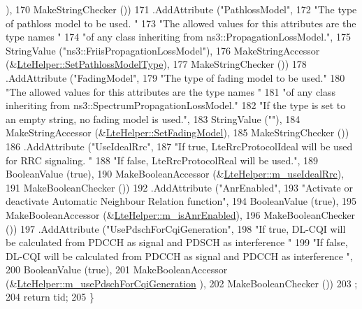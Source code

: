 \begin{DoxyCode}
      ),
170                    MakeStringChecker ())
171     .AddAttribute (\textcolor{stringliteral}{"PathlossModel"},
172                    \textcolor{stringliteral}{"The type of pathloss model to be used. "}
173                    \textcolor{stringliteral}{"The allowed values for this attributes are the type names "}
174                    \textcolor{stringliteral}{"of any class inheriting from ns3::PropagationLossModel."},
175                    StringValue (\textcolor{stringliteral}{"ns3::FriisPropagationLossModel"}),
176                    MakeStringAccessor (&\hyperlink{classns3_1_1LteHelper_afc1acbe82dd719d319e7d79b50e99ba7}{LteHelper::SetPathlossModelType}),
177                    MakeStringChecker ())
178     .AddAttribute (\textcolor{stringliteral}{"FadingModel"},
179                    \textcolor{stringliteral}{"The type of fading model to be used."}
180                    \textcolor{stringliteral}{"The allowed values for this attributes are the type names "}
181                    \textcolor{stringliteral}{"of any class inheriting from ns3::SpectrumPropagationLossModel."}
182                    \textcolor{stringliteral}{"If the type is set to an empty string, no fading model is used."},
183                    StringValue (\textcolor{stringliteral}{""}),
184                    MakeStringAccessor (&\hyperlink{classns3_1_1LteHelper_a36b39e1d4a50f4647e81967685ac62ff}{LteHelper::SetFadingModel}),
185                    MakeStringChecker ())
186     .AddAttribute (\textcolor{stringliteral}{"UseIdealRrc"},
187                    \textcolor{stringliteral}{"If true, LteRrcProtocolIdeal will be used for RRC signaling. "}
188                    \textcolor{stringliteral}{"If false, LteRrcProtocolReal will be used."},
189                    BooleanValue (\textcolor{keyword}{true}), 
190                    MakeBooleanAccessor (&\hyperlink{classns3_1_1LteHelper_ab230ddf0db292c4ea6482e80bac0d53a}{LteHelper::m\_useIdealRrc}),
191                    MakeBooleanChecker ())
192     .AddAttribute (\textcolor{stringliteral}{"AnrEnabled"},
193                    \textcolor{stringliteral}{"Activate or deactivate Automatic Neighbour Relation function"},
194                    BooleanValue (\textcolor{keyword}{true}),
195                    MakeBooleanAccessor (&\hyperlink{classns3_1_1LteHelper_a7ea3223dfc520265e1c8423b55b9ab18}{LteHelper::m\_isAnrEnabled}),
196                    MakeBooleanChecker ())
197     .AddAttribute (\textcolor{stringliteral}{"UsePdschForCqiGeneration"},
198                    \textcolor{stringliteral}{"If true, DL-CQI will be calculated from PDCCH as signal and PDSCH as interference "}
199                    \textcolor{stringliteral}{"If false, DL-CQI will be calculated from PDCCH as signal and PDCCH as interference  "},
200                    BooleanValue (\textcolor{keyword}{true}),
201                    MakeBooleanAccessor (&\hyperlink{classns3_1_1LteHelper_abbc3c36de95dcca35d9516c7882104f6}{LteHelper::m\_usePdschForCqiGeneration}
      ),
202                    MakeBooleanChecker ())
203   ;
204   \textcolor{keywordflow}{return} tid;
205 \}
\end{DoxyCode}


